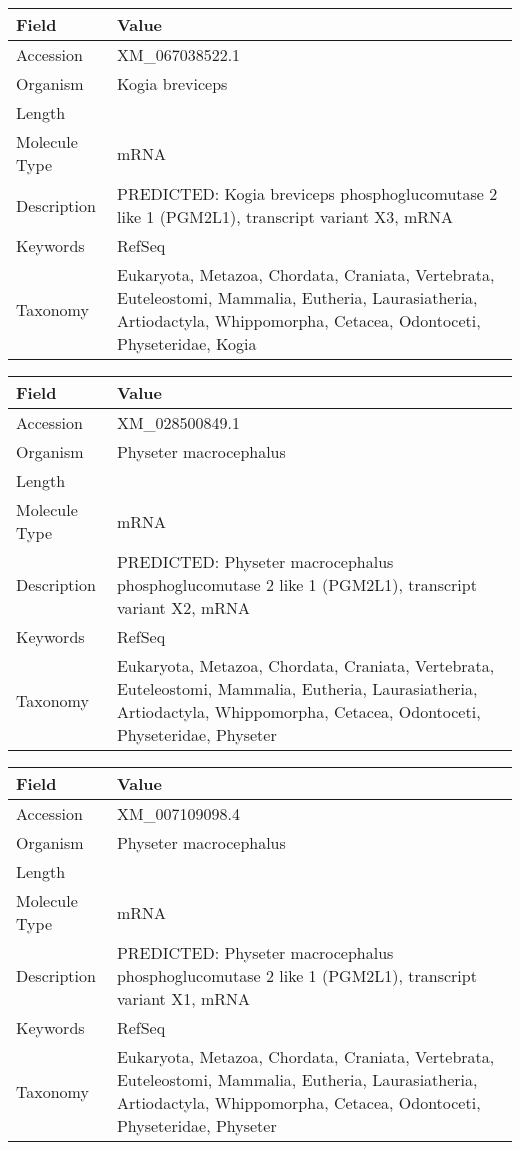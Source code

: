 \documentclass[10pt]{article}
\begin{document}
\vspace{1em}
{\footnotesize
\begin{longtable}{>{\raggedright\arraybackslash}p{4.5cm} >{\raggedright\arraybackslash}p{11.5cm}}
\textbf{Field} & \textbf{Value} \\
\hline
Accession & XM\_067038522.1 \\
Organism & Kogia breviceps \\
Length & 7088 \\
Molecule Type & mRNA \\
Description & PREDICTED: Kogia breviceps phosphoglucomutase 2 like 1 (PGM2L1), transcript variant X3, mRNA \\
Keywords & RefSeq \\
Taxonomy & Eukaryota, Metazoa, Chordata, Craniata, Vertebrata, Euteleostomi, Mammalia, Eutheria, Laurasiatheria, Artiodactyla, Whippomorpha, Cetacea, Odontoceti, Physeteridae, Kogia \\
\end{longtable}
}

\vspace{1em}
{\footnotesize
\begin{longtable}{>{\raggedright\arraybackslash}p{4.5cm} >{\raggedright\arraybackslash}p{11.5cm}}
\textbf{Field} & \textbf{Value} \\
\hline
Accession & XM\_028500849.1 \\
Organism & Physeter macrocephalus \\
Length & 2159 \\
Molecule Type & mRNA \\
Description & PREDICTED: Physeter macrocephalus phosphoglucomutase 2 like 1 (PGM2L1), transcript variant X2, mRNA \\
Keywords & RefSeq \\
Taxonomy & Eukaryota, Metazoa, Chordata, Craniata, Vertebrata, Euteleostomi, Mammalia, Eutheria, Laurasiatheria, Artiodactyla, Whippomorpha, Cetacea, Odontoceti, Physeteridae, Physeter \\
\end{longtable}
}

\vspace{1em}
{\footnotesize
\begin{longtable}{>{\raggedright\arraybackslash}p{4.5cm} >{\raggedright\arraybackslash}p{11.5cm}}
\textbf{Field} & \textbf{Value} \\
\hline
Accession & XM\_007109098.4 \\
Organism & Physeter macrocephalus \\
Length & 2830 \\
Molecule Type & mRNA \\
Description & PREDICTED: Physeter macrocephalus phosphoglucomutase 2 like 1 (PGM2L1), transcript variant X1, mRNA \\
Keywords & RefSeq \\
Taxonomy & Eukaryota, Metazoa, Chordata, Craniata, Vertebrata, Euteleostomi, Mammalia, Eutheria, Laurasiatheria, Artiodactyla, Whippomorpha, Cetacea, Odontoceti, Physeteridae, Physeter \\
\end{longtable}
}
\end{document}
